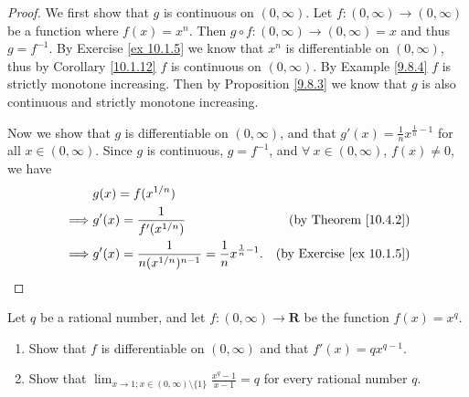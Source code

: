\begin{proof}
    We first show that \(g\) is continuous on \((0, \infty)\).
    Let \(f : (0, \infty) \to (0, \infty)\) be a function where \(f(x) = x^n\).
    Then \(g \circ f : (0, \infty) \to (0, \infty) = x\) and thus \(g = f^{-1}\).
    By Exercise \ref{ex 10.1.5} we know that \(x^n\) is differentiable on \((0, \infty)\), thus by Corollary \ref{10.1.12} \(f\) is continuous on \((0, \infty)\).
    By Example \ref{9.8.4} \(f\) is strictly monotone increasing.
    Then by Proposition \ref{9.8.3} we know that \(g\) is also continuous and strictly monotone increasing.

    Now we show that \(g\) is differentiable on \((0, \infty)\), and that \(g'(x) = \frac{1}{n} x^{\frac{1}{n} - 1}\) for all \(x \in (0, \infty)\).
    Since \(g\) is continuous, \(g = f^{-1}\), and \(\forall\ x \in (0, \infty)\), \(f(x) \neq 0\), we have
    \begin{align*}
                 & g(x) = f(x^{1 / n})                                                                                               \\
        \implies & g'(x) = \frac{1}{f'(x^{1 / n})}                                            & \text{(by Theorem \ref{10.4.2})}     \\
        \implies & g'(x) = \frac{1}{n (x^{1 / n})^{n - 1}} = \frac{1}{n} x^{\frac{1}{n} - 1}. & \text{(by Exercise \ref{ex 10.1.5})}
    \end{align*}
\end{proof}

\begin{exercise}\label{ex 10.4.2}
    Let \(q\) be a rational number, and let \(f : (0, \infty) \to \mathbf{R}\) be the function \(f(x) = x^q\).
    \begin{enumerate}
        \item Show that \(f\) is differentiable on \((0, \infty)\) and that \(f'(x) = q x^{q - 1}\).
        \item Show that \(\lim_{x \to 1 ; x \in (0, \infty) \setminus \{1\}} \frac{x^q - 1}{x - 1} = q\) for every rational number \(q\).
    \end{enumerate}
\end{exercise}

